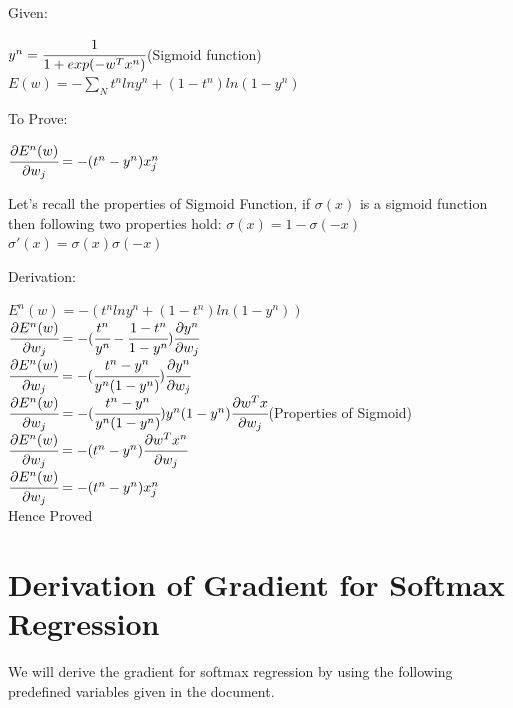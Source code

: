 \documentclass{article} %
\begin{document}
Given:
\begin{center}
	$y^n=\cfrac{1}{1+exp(-w^T x^n)}$(Sigmoid function)\\
    \hfill\break
    $E(w) = -\sum_N t^n lny^n + (1-t^n) ln(1-y^n)$
    \hfill
\end{center}
To Prove:
\begin{center}
    $\cfrac{\partial E^n(w)}{\partial w_j} = -(t^n-y^n)x^n_j $\\
    \hfill    
\end{center}
\begin{center}
Let's recall the properties of Sigmoid Function, if $\sigma(x)$ is a sigmoid function then following two properties hold:
\hfill\break
$\sigma(x)=1-\sigma(-x)$\\
\hfill\break
$\sigma'(x)=\sigma(x)\sigma(-x)$\\
\hfill\break
\end{center}
Derivation:
\begin{center}
$E^n(w) = -(t^n lny^n + (1-t^n) ln(1-y^n))$\\
\hfill\break
\hfill\break
$\cfrac{\partial E^n(w)}{\partial w_j} = -(\cfrac{t^n}{y^n} - \cfrac{1-t^n}{1-y^n})\cfrac{\partial y^n}{\partial w_j}$\\
    \hfill\break
    \hfill\break
$\cfrac{\partial E^n(w)}{\partial w_j} = -(\cfrac{t^n-y^n}{y^n(1-y^n)})\cfrac{\partial y^n}{\partial w_j}$\\
    \hfill\break
    \hfill\break
$\cfrac{\partial E^n(w)}{\partial w_j} = -(\cfrac{t^n-y^n}{y^n(1-y^n)})y^n(1-y^n)\cfrac{\partial w^Tx}{\partial w_j}$(Properties of Sigmoid)\\
    \hfill\break
    \hfill\break
$\cfrac{\partial E^n(w)}{\partial w_j} = -(t^n-y^n)\cfrac{\partial w^Tx^n}{\partial w_j}$\\
    \hfill\break
    \hfill\break
$\cfrac{\partial E^n(w)}{\partial w_j} = -(t^n-y^n)x^n_j$\\
    \hfill\break
    Hence Proved 

\end{center}
\section{Derivation of Gradient for Softmax Regression}
We will derive the gradient for softmax regression by using the following predefined variables given in the document.
\end{document}
